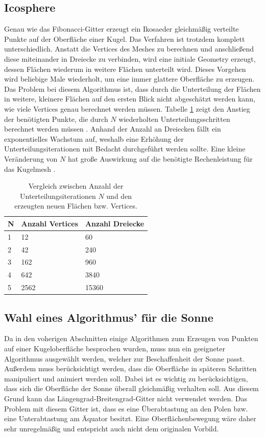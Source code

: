 \subsection{Icosphere}
Genau wie das Fibonacci-Gitter erzeugt ein Ikosaeder gleichmäßig verteilte
Punkte auf der Oberfläche einer Kugel. Das Verfahren ist trotzdem komplett
unterschiedlich. Anstatt die Vertices des Meshes zu berechnen und
anschließend diese miteinander in Dreiecke zu verbinden, wird eine initiale
Geometry erzeugt, dessen Flächen wiederum in weitere Flächen unterteilt wird.
Dieses Vorgehen wird beliebige Male wiederholt, um eine immer glattere
Oberfläche zu erzeugen. Das Problem bei diesem Algorithmus ist, dass durch
die Unterteilung der Flächen in weitere, kleinere Flächen auf den ersten
Blick nicht abgeschätzt werden kann, wie viele Vertices genau berechnet
werden müssen. Tabelle \ref{table:icosahedron-complexity} zeigt den Anstieg
der benötigten Punkte, die durch $N$ wiederholten Unterteilungsschritten
berechnet werden müssen \cite{Marc2019}. Anhand der Anzahl an Dreiecken fällt ein
exponentielles Wachstum auf, weshalb eine Erhöhung der
Unterteilungsiterationen mit Bedacht durchgeführt werden sollte. Eine kleine
Veränderung von $N$ hat große Auswirkung auf die benötigte Rechenleistung für
das Kugelmesh \cite{BlenderPrimitives}.

\begin{table}
  \caption{Vergleich zwischen Anzahl der Unterteilungsiterationen $N$ und den erzeugten neuen Flächen bzw. Vertices.}
  \label{table:icosahedron-complexity}
  \begin{tabularx}{\columnwidth}{lXX}
    \textbf{N} & \textbf{Anzahl Vertices} & \textbf{Anzahl Dreiecke} \\
    \hline
    1 & 12   & 60 \\
    2 & 42   & 240 \\
    3 & 162  & 960 \\
    4 & 642  & 3840 \\
    5 & 2562 & 15360
  \end{tabularx}
\end{table}
\FloatBarrier

\subsection{Wahl eines Algorithmus' für die Sonne}
Da in den voherigen Abschnitten einige Algorithmen zum Erzeugen von Punkten
auf einer Kugeloberfläche besprochen wurden, muss nun ein geeigneter
Algorithmus ausgewählt werden, welcher zur Beschaffenheit der Sonne passt.
Außerdem muss berücksichtigt werden, dass die Oberfläche in späteren
Schritten manipuliert und animiert werden soll. Dabei ist es wichtig zu
berücksichtigen, dass sich die Oberfläche der Sonne überall gleichmäßig
verhalten soll. Aus diesem Grund kann das Längengrad-Breitengrad-Gitter nicht
verwendet werden. Das Problem mit diesem Gitter ist, dass es eine
Überabtastung an den Polen bzw. eine Unterabtastung am Äquator besitzt. Eine
Oberflächenbewegung wäre daher sehr unregelmäßig und entspricht auch nicht dem
originalen Vorbild.

